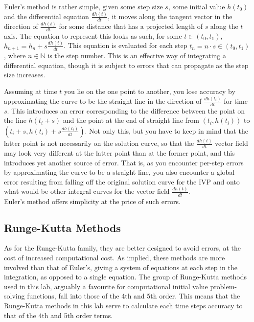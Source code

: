 \documentclass[11pt]{article}
\begin{document}
    Euler's method is rather simple, given some step size $s$, some initial value $h(t_0)$ and the differential equation $\frac{dh(t)}{dt}$, it moves along the tangent vector in the direction of $\frac{dh(t)}{dt}$ for some distance that has a projected length of $s$ along the $t$ axis.
    The equation to represent this looks as such, for some $t \in (t_0,t_1)$, $h_{n+1} = h_n + s\frac{dh(t)}{dt}$.
    This equation is evaluated for each step $t_n = n\cdot s \in (t_0,t_1)$, where $n \in \mathbb{N}$ is the step number.
    This is an effective way of integrating a differential equation, though it is subject to errors that can propagate as the step size increases.

    Assuming at time $t$ you lie on the one point to another, you lose accuracy by approximating the curve to be the straight line in the direction of $\frac{dh(t_i)}{dt}$ for time $s$.
    This introduces an error corresponding to the difference between the point on the line $h(t_i+s)$ and the point at the end of straight line from $(t_i, h(t_i))$ to $(t_i + s, h(t_i) + s\frac{dh(t_i)}{dt})$.
    Not only this, but you have to keep in mind that the latter point is not necessarily on the solution curve, so that the $\frac{dh(t)}{dt}$ vector field may look very different at the latter point than at the former point, and this introduces yet another source of error.
    That is, as you encounter per-step errors by approximating the curve to be a straight line, you also encounter a global error resulting from falling off the original solution curve for the IVP and onto what would be other integral curves for the vector field $\frac{dh(t)}{dt}$.\\
    Euler's method offers simplicity at the price of such errors.

\subsection{Runge-Kutta Methods}
    As for the Runge-Kutta family, they are better designed to avoid errors, at the cost of increased computational cost.
    As implied, these methods are more involved than that of Euler's, giving a system of equations at each step in the integration, as opposed to a single equation.
    The group of Runge-Kutta methods used in this lab, arguably a favourite for computational initial value problem-solving functions, fall into those of the 4th and 5th order.
    This means that the Runge-Kutta methods in this lab serve to calculate each time steps accuracy to that of the 4th and 5th order terms.
\end{document}
